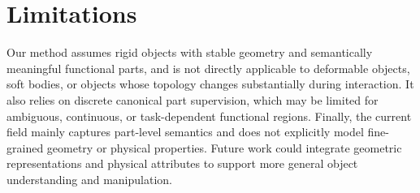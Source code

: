 \section{Limitations}
Our method assumes rigid objects with stable geometry and semantically meaningful functional parts, and is not directly applicable to deformable objects, soft bodies, or objects whose topology changes substantially during interaction. It also relies on discrete canonical part supervision, which may be limited for ambiguous, continuous, or task-dependent functional regions. Finally, the current field mainly captures part-level semantics and does not explicitly model fine-grained geometry or physical properties. Future work could integrate geometric representations and physical attributes to support more general object understanding and manipulation.

